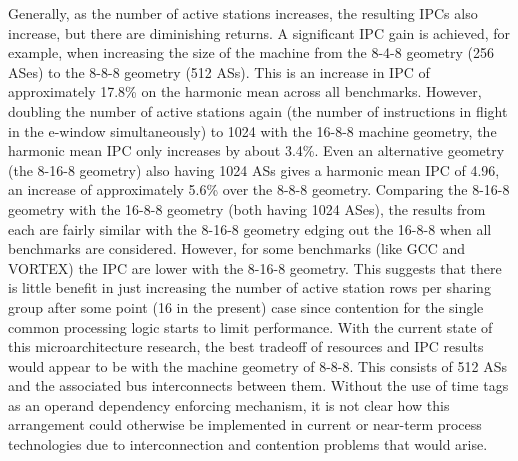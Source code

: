 \documentclass[10pt,dvips]{article}
\begin{document}
%
Generally, as the number of active stations increases,
the resulting IPCs also increase, but there are diminishing returns.
A significant IPC gain is achieved, for example, when increasing the
size of the machine from the 8-4-8 geometry (256 ASes) to the 8-8-8 geometry
(512 ASs).  This is an increase in IPC of approximately 17.8\% on the
harmonic mean across all benchmarks.  However, doubling the number
of active stations again (the number of instructions in flight
in the e-window simultaneously) to 1024 with the 16-8-8 machine geometry,
the harmonic mean IPC only increases by about 3.4\%.  Even an
alternative geometry (the 8-16-8 geometry) also having 1024 ASs
gives a harmonic mean IPC of 4.96, an increase of approximately 5.6\%
over the 8-8-8 geometry.
Comparing the 8-16-8 geometry with the 16-8-8 geometry (both having
1024 ASes), the results from each are fairly similar with the
8-16-8 geometry edging out the 16-8-8 when all benchmarks are
considered.  However, for some benchmarks (like GCC and VORTEX)
the IPC are lower with the 8-16-8 geometry.  This suggests that
there is little benefit in just increasing the number of active station
rows per sharing group after some point (16 in the present) case
since contention for the single common processing logic starts
to limit performance.
With the current state of this microarchitecture research,
the best tradeoff of resources and IPC results would appear
to be with the machine geometry of 8-8-8.  This consists of 512
ASs and the associated bus interconnects between them. 
Without the use of time tags as an operand dependency enforcing
mechanism, it is not clear how this arrangement could otherwise be 
implemented
in current or near-term process technologies due to interconnection
and contention problems that would arise.
\end{document}
